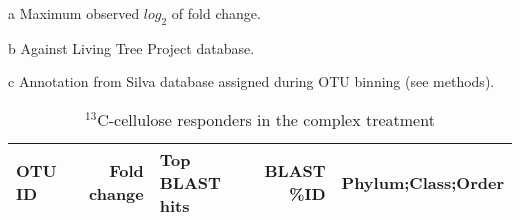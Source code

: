 \documentclass[10pt]{article}
\begin{document}
\setcounter{table}{2}
\setcounter{section}{3}

\pagestyle{empty}

\begin{ThreePartTable}
\begin{TableNotes}
\item[a] Maximum observed $log_{2}$ of fold change. 
\item[b] Against Living Tree Project database.
\item[c] Annotation from Silva database assigned during OTU binning (see methods).
\end{TableNotes}

\begin{longtable}{lrP{5cm}rP{7cm}}

\caption{$^{13}$C-cellulose responders in the complex treatment} \\
\toprule 
    \textbf{OTU ID} & 
    \textbf{Fold change}  &  
    \textbf{Top BLAST hits} & 
    \textbf{BLAST \%ID} & 
    \textbf{Phylum;Class;Order} \\
\midrule
\endfirsthead


\end{longtable}
\end{ThreePartTable}
\end{document}
